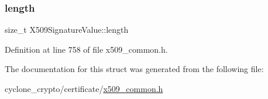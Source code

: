 \mbox{\label{structX509SignatureValue_af1bce8baf0e1a46212467145e00079d7}} 
\subsubsection{\texorpdfstring{length}{length}}
{\footnotesize\ttfamily size\+\_\+t X509\+Signature\+Value\+::length}



Definition at line 758 of file x509\+\_\+common.\+h.



The documentation for this struct was generated from the following file\+:\begin{DoxyCompactItemize}
\item 
cyclone\+\_\+crypto/certificate/\hyperlink{certificate_2x509__common_8h}{x509\+\_\+common.\+h}\end{DoxyCompactItemize}
